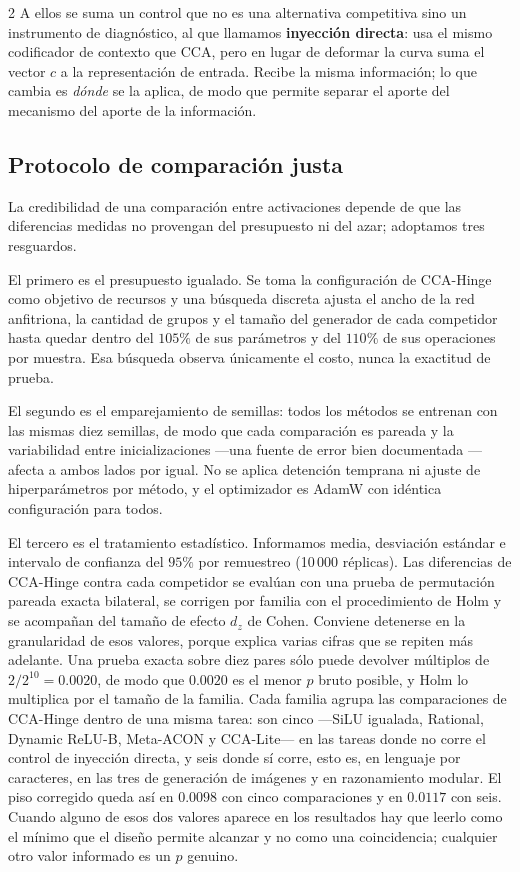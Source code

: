 \begin{multicols}{2}
A ellos se suma un control que no es una alternativa competitiva sino un instrumento de diagnóstico, al que llamamos \textbf{inyección directa}: usa el mismo codificador de contexto que CCA, pero en lugar de deformar la curva suma el vector $c$ a la representación de entrada. Recibe la misma información; lo que cambia es \textit{dónde} se la aplica, de modo que permite separar el aporte del mecanismo del aporte de la información.

\subsection{Protocolo de comparación justa}

La credibilidad de una comparación entre activaciones depende de que las diferencias medidas no provengan del presupuesto ni del azar; adoptamos tres resguardos.

El primero es el presupuesto igualado. Se toma la configuración de CCA-Hinge como objetivo de recursos y una búsqueda discreta ajusta el ancho de la red anfitriona, la cantidad de grupos y el tamaño del generador de cada competidor hasta quedar dentro del $105\%$ de sus parámetros y del $110\%$ de sus operaciones por muestra. Esa búsqueda observa únicamente el costo, nunca la exactitud de prueba.

El segundo es el emparejamiento de semillas: todos los métodos se entrenan con las mismas diez semillas, de modo que cada comparación es pareada y la variabilidad entre inicializaciones —una fuente de error bien documentada \cite{bouthillier2021accounting}— afecta a ambos lados por igual. No se aplica detención temprana ni ajuste de hiperparámetros por método, y el optimizador es AdamW con idéntica configuración para todos.

El tercero es el tratamiento estadístico. Informamos media, desviación estándar e intervalo de confianza del $95\%$ por remuestreo (10\,000 réplicas). Las diferencias de CCA-Hinge contra cada competidor se evalúan con una prueba de permutación pareada exacta bilateral, se corrigen por familia con el procedimiento de Holm \cite{holm1979simple} y se acompañan del tamaño de efecto $d_z$ de Cohen. Conviene detenerse en la granularidad de esos valores, porque explica varias cifras que se repiten más adelante. Una prueba exacta sobre diez pares sólo puede devolver múltiplos de $2/2^{10}=0.0020$, de modo que $0.0020$ es el menor $p$ bruto posible, y Holm lo multiplica por el tamaño de la familia. Cada familia agrupa las comparaciones de CCA-Hinge dentro de una misma tarea: son cinco —SiLU igualada, Rational, Dynamic ReLU-B, Meta-ACON y CCA-Lite— en las tareas donde no corre el control de inyección directa, y seis donde sí corre, esto es, en lenguaje por caracteres, en las tres de generación de imágenes y en razonamiento modular. El piso corregido queda así en $0.0098$ con cinco comparaciones y en $0.0117$ con seis. Cuando alguno de esos dos valores aparece en los resultados hay que leerlo como el mínimo que el diseño permite alcanzar y no como una coincidencia; cualquier otro valor informado es un $p$ genuino.


\end{multicols}
